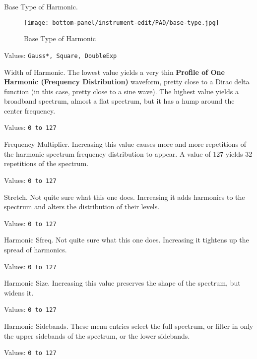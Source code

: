    \setcounter{ItemCounter}{0}      %

   Base Type of Harmonic.

\begin{figure}[H]
   \centering 
   \texttt{[image: bottom-panel/instrument-edit/PAD/base-type.jpg]}
   \caption{Base Type of Harmonic}
   \label{fig:padsynth_base_type_of_harmonic}
\end{figure}

   Values: \texttt{Gauss*, Square, DoubleExp}

   Width of Harmonic.
   The lowest value yields a very thin
   \textbf{Profile of One Harmonic (Frequency Distribution)}
   waveform, pretty close to a Dirac delta function (in this case, pretty close
   to a sine wave).
   The highest value yields a broadband spectrum, almost a flat spectrum, but
   it has a hump around the center frequency.

   Values: \texttt{0 to 127}

   Frequency Multiplier.
   Increasing this value causes more and more repetitions of the harmonic
   spectrum frequency distribution to appear.  A value of 127 yields 32
   repetitions of the spectrum.

   Values: \texttt{0 to 127}

   Stretch.
   Not quite sure what this one does.  Increasing it adds harmonics to the
   spectrum and alters the distribution of their levels.

   Values: \texttt{0 to 127}

   Harmonic Sfreq.
   Not quite sure what this one does.  Increasing it tightens up the spread of
   harmonics.

   Values: \texttt{0 to 127}

   Harmonic Size.
   Increasing this value preserves the shape of the spectrum, but widens it.

   Values: \texttt{0 to 127}

   Harmonic Sidebands.
   These menu entries select the full spectrum, or filter in only 
   the upper sidebands of the spectrum, or the lower sidebands.

   Values: \texttt{0 to 127}

